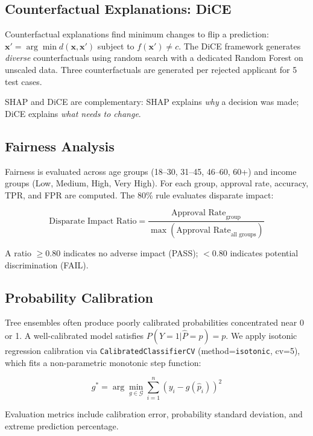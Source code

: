 \documentclass[journal]{IEEEtran}
\begin{document}
\subsection{Counterfactual Explanations: DiCE}

Counterfactual explanations find minimum changes to flip a prediction: $\mathbf{x}' = \arg\min d(\mathbf{x}, \mathbf{x}')$ subject to $f(\mathbf{x}') \neq c$. The DiCE framework generates \textit{diverse} counterfactuals using random search with a dedicated Random Forest on unscaled data. Three counterfactuals are generated per rejected applicant for 5 test cases.

SHAP and DiCE are complementary: SHAP explains \textit{why} a decision was made; DiCE explains \textit{what needs to change}.


\subsection{Fairness Analysis}

Fairness is evaluated across age groups (18--30, 31--45, 46--60, 60+) and income groups (Low, Medium, High, Very High). For each group, approval rate, accuracy, TPR, and FPR are computed. The 80\% rule evaluates disparate impact:

\begin{equation}
\text{Disparate Impact Ratio} = \frac{\text{Approval Rate}_{\text{group}}}{\max(\text{Approval Rate}_{\text{all groups}})}
\end{equation}

A ratio $\geq 0.80$ indicates no adverse impact (PASS); $< 0.80$ indicates potential discrimination (FAIL).


\subsection{Probability Calibration}

Tree ensembles often produce poorly calibrated probabilities concentrated near 0 or 1. A well-calibrated model satisfies $P(Y{=}1|\hat{P}{=}p) = p$. We apply isotonic regression calibration \cite{zadrozny2002} via \texttt{CalibratedClassifierCV} (method=\texttt{isotonic}, cv=5), which fits a non-parametric monotonic step function:

\begin{equation}
g^* = \arg\min_{g \in \mathcal{G}} \sum_{i=1}^{n} (y_i - g(\hat{p}_i))^2
\end{equation}

Evaluation metrics include calibration error, probability standard deviation, and extreme prediction percentage.
\end{document}
